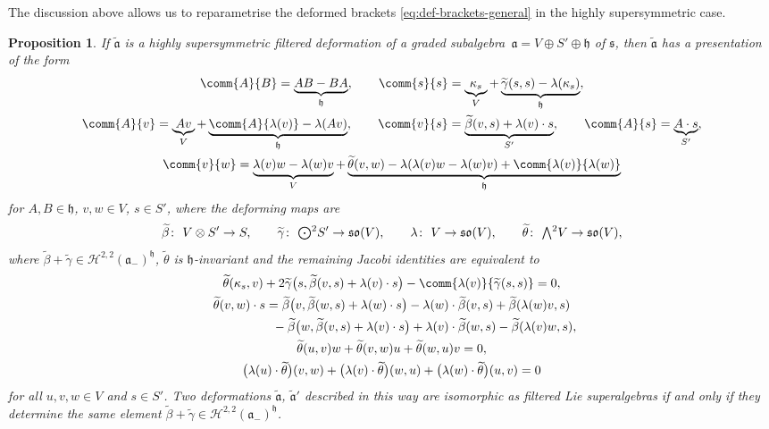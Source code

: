 \documentclass[pdftex]{sigma}
\numberwithin{equation}{section}
\newtheorem{Proposition}[Theorem]{Proposition}
 { \theoremstyle{definition}
\newtheorem{Definition}[Theorem]{Definition}
\newtheorem{Note}[Theorem]{Note}
\newtheorem{Example}[Theorem]{Example}
\newtheorem{Remark}[Theorem]{Remark} }
\newcommand{\fa}{\mathfrak{a}}
\newcommand{\fh}{\mathfrak{h}}
\newcommand{\fs}{\mathfrak{s}}
\newcommand{\fso}{\mathfrak{so}}
\newcommand{\cH}{\mathcal{H}}
\newcommand{\betatilde}{\widetilde{\beta}}
\newcommand{\gammatilde}{\widetilde{\gamma}}
\newcommand{\thetatilde}{\widetilde{\theta}}
\newcommand{\fatilde}{\widetilde{\fa}}
\newcommand{\Wedge}{\mathchoice{{\textstyle\bigwedge}}{\bigwedge}{\bigwedge}{\bigwedge}}	%
\newcommand{\Odot}{\mathchoice{{\textstyle\bigodot}}{\bigodot}{\bigodot}{\bigodot}}
\newcommand{\1}{\mathbbm{1}}
\begin{document}
The discussion above allows us to reparametrise the deformed brackets \eqref{eq:def-brackets-general} in the highly supersymmetric case.

\begin{Proposition}\label{prop:filtered-def-high-susy}
	If $\fatilde$ is a highly supersymmetric filtered deformation of a graded subalgebra~${\fa=V\oplus S'\oplus \fh}$ of $\fs$, then $\fatilde$ has a presentation of the form
	\begin{gather}
		\comm{A}{B} = \underbrace{AB-BA}_\fh,\qquad
		\comm{s}{s} = \underbrace{\kappa_s}_V + \underbrace{\gammatilde(s,s) - \lambda(\kappa_s)}_\fh,\nonumber\\
		\comm{A}{v} = \underbrace{Av}_V + \underbrace{\comm{A}{\lambda(v)} - \lambda(Av)}_\fh,\qquad
		\comm{v}{s} = \underbrace{\betatilde(v,s) + \lambda(v)\cdot s}_{S'},\qquad
		\comm{A}{s} = \underbrace{A\cdot s}_{S'},\nonumber
	\\
		\comm{v}{w} = \underbrace{\lambda(v)w-\lambda(w)v}_V + \underbrace{\thetatilde(v,w) - \lambda(\lambda(v)w-\lambda(w)v) + \comm{\lambda(v)}{\lambda(w)}}_\fh\label{eq:def-brackets-V}
	\end{gather}
	for $A,B\in\fh$, $v,w\in V$, $s\in S'$, where the deforming maps are
	\[
\betatilde\colon\ V\otimes S' \to S,\qquad
		\gammatilde\colon\ \Odot^2 S' \to \fso(V),\qquad
		\lambda\colon\ V\to\fso(V),\qquad
		\thetatilde\colon\ \Wedge^2 V \to \fso(V),
	\]
	where $\betatilde+\gammatilde\in\cH^{2,2}(\fa_-)^\fh$, $\thetatilde$ is $\fh$-invariant and the remaining Jacobi identities are equivalent to
	\begin{gather}
		\thetatilde(\kappa_s,v) + 2\gammatilde\bigl(s,\betatilde(v,s)+\lambda(v)\cdot s\bigr) - \comm{\lambda(v)}{\gammatilde(s,s)} = 0, \label{eq:tilde-theta-kappa}\\
		\thetatilde(v,w)\cdot s
		= \betatilde\bigl(v,\betatilde(w,s)+\lambda(w)\cdot s\bigr)
			- \lambda(w)\cdot \betatilde(v,s) + \betatilde(\lambda(w)v,s)\nonumber\\
			\phantom{\thetatilde(v,w)\cdot s
		=}{} - \betatilde\bigl(w,\betatilde(v,s)+\lambda(v)\cdot s\bigr)
			+ \lambda(v)\cdot \betatilde(w,s) - \betatilde(\lambda(v)w,s),\label{eq:tilde-theta-lambda}\\
		\thetatilde(u,v)w + \thetatilde(v,w)u + \thetatilde(w,u)v =0,\label{eq:tilde-theta-bianchi}\\
		\bigl(\lambda(u)\cdot\thetatilde\bigr)(v,w) + \bigl(\lambda(v)\cdot\thetatilde\bigr)(w,u) +			\bigl(\lambda(w)\cdot\thetatilde\bigr)(u,v) = 0 \label{eq:tilde-theta-lambda-bianchi}
	\end{gather}
	for all $u,v,w\in V$ and $s\in S'$.
	Two deformations $\fatilde$, $\fatilde'$ described in this way are isomorphic as filtered Lie superalgebras if and only if they determine the same element $\betatilde+\gammatilde\in\cH^{2,2}(\fa_-)^\fh$.
\end{Proposition}
\end{document}
